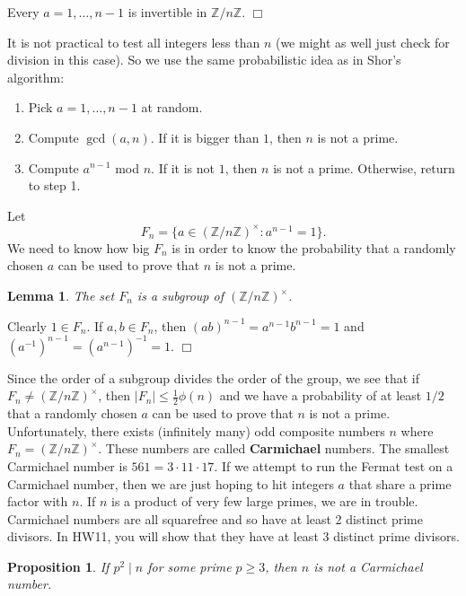 \documentclass{article}
\def\Z{{\mathbb Z}}
\def\Z{{\mathbb Z}}
\newtheorem{lemma}[subsection]{Lemma}
\newtheorem{proposition}[subsection]{Proposition}
\newenvironment{proof}{\noindent {\bf Proof:}}{$\Box$ \vspace{2 ex}}
\begin{document}
\begin{proof}
    Every $a = 1,\ldots,n-1$ is invertible in $\Z/n\Z$.
\end{proof}

It is not practical to test all integers less than $n$ (we might as well just check for division in this case). So we use the same probabilistic idea as in Shor's algorithm: 
\begin{enumerate}
    \item Pick $a = 1,\ldots,n-1$ at random.
    \item Compute $\gcd(a,n)$. If it is bigger than $1$, then $n$ is not a prime.
    \item Compute $a^{n-1}$ mod $n$. If it is not $1$, then $n$ is not a prime. Otherwise, return to step 1.
\end{enumerate}
Let $$F_n = \{a\in (\Z/n\Z)^\times \colon a^{n-1} = 1\}.$$
We need to know how big $F_n$ is in order to know the probability that a randomly chosen $a$ can be used to prove that $n$ is not a prime.

\begin{lemma}
    The set $F_n$ is a subgroup of $(\Z/n\Z)^\times$.
\end{lemma}

\begin{proof}
    Clearly $1\in F_n$. If $a,b\in F_n$, then $(ab)^{n-1} = a^{n-1}b^{n-1} = 1$ and $(a^{-1})^{n-1} = (a^{n-1})^{-1} = 1$. 
\end{proof}

Since the order of a subgroup divides the order of the group, we see that if $F_n\neq(\Z/n\Z)^\times$, then $|F_n| \leq \frac12\phi(n)$ and we have a probability of at least $1/2$ that a randomly chosen $a$ can be used to prove that $n$ is not a prime. Unfortunately, there exists (infinitely many) odd composite numbers $n$ where $F_n = (\Z/n\Z)^\times$. These numbers are called \textbf{Carmichael} numbers. The smallest Carmichael number is $561 = 3\cdot 11\cdot 17.$ If we attempt to run the Fermat test on a Carmichael number, then we are just hoping to hit integers $a$ that share a prime factor with $n$. If $n$ is a product of very few large primes, we are in trouble. Carmichael numbers are all squarefree and so have at least 2 distinct prime divisors. In HW11, you will show that they have at least 3 distinct prime divisors.

\begin{proposition}
    If $p^2\mid n$ for some prime $p\geq 3$, then $n$ is not a Carmichael number.
\end{proposition}
\end{document}
